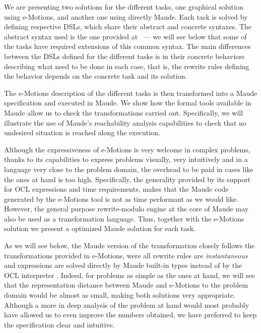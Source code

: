 
We are presenting two solutions for the different tasks, one graphical solution using e-Motions, and another one using directly Maude. Each task is solved by defining respective DSLs, which share their abstract and concrete syntaxes. The abstract syntax used is the one provided at~\cite{imdbsources} --- we will see below that some of the tasks have required extensions of this common syntax. The main differences between the DSLs defined for the different tasks is in their  concrete behaviors describing what need to be done in each case, that is, the rewrite rules defining the behavior depends on the concrete task and its solution. 

The e-Motions description of the different tasks is then transformed into a Maude specification and executed in Maude. We show how the formal tools available in Maude allow us to check the transformations carried out. Specifically, we will illustrate the use of Maude's reachability analysis capabilities to check that no undesired situation is reached along the execution. 

Although the expressiveness of e-Motions is very welcome in complex problems, thanks to its capabilities to express problems visually, very intuitively and in a language very close to the problem domain, the overhead to be paid in cases like the ones at hand is too high. Specifically, the generality provided by its support for OCL expressions and time requirements, makes that the Maude code generated by the e-Motions tool is not as time performant as we would like. However, the general purpose rewrite-modulo engine at the core of Maude may also be used as a transformation language. Thus, together with the e-Motions solution we present a optimized Maude solution for each task.  

As we will see below, the Maude version of the transformation closely follows the transformations provided in e-Motions, were all rewrite rules are \textit{instantaneous} and expressions are solved directly by Maude built-in types instead of by the OCL interpreter \cite{mOdCL}. Indeed, for problems as simple as the ones at hand, we will see that the representation distance between Maude and e-Motions to the problem domain would be almost as small, making both solutions very appropriate. Although a more in deep analysis of the problem at hand would most probably have allowed us to even improve the numbers obtained, we have preferred to keep the specification clear and intuitive.

